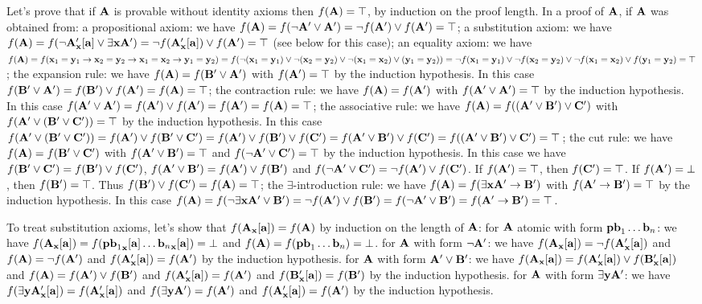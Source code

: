Let's prove that if ${\bf A}$ is provable without identity axioms then $f({\bf A}) = \top$, by induction on the proof length.
In a proof of ${\bf A}$, if ${\bf A}$ was obtained from:
\itemitem{$\bullet$} a propositional axiom: we have $f({\bf A}) = f(\neg {\bf A}' \lor {\bf A}') = \neg f({\bf A}') \lor f({\bf A}') = \top$;
\itemitem{$\bullet$} a substitution axiom: we have 
$f({\bf A}) = f(\neg {\bf A}'_{\bf x}[{\bf a}] \lor \exists {\bf x}{\bf A}') = \neg f({\bf A}'_{\bf x}[{\bf a}]) \lor f({\bf A}') = \top$ (see below for this case);
\itemitem{$\bullet$} an equality axiom: we have $f({\bf A}) = 
f({\bf x}_1 = {\bf y}_1 \to {\bf x}_2 = {\bf y}_2 \to {\bf x}_1 = {\bf x}_2 \to {\bf y}_1 = {\bf y}_2) =
f(\neg ({\bf x}_1 = {\bf y}_1) \lor \neg ({\bf x}_2 = {\bf y}_2) \lor \neg ({\bf x}_1 = {\bf x}_2) \lor ({\bf y}_1 = {\bf y}_2)) =
\neg f({\bf x}_1 = {\bf y}_1) \lor \neg f({\bf x}_2 = {\bf y}_2) \lor \neg f({\bf x}_1 = {\bf x}_2) \lor f({\bf y}_1 = {\bf y}_2) = \top$;
\itemitem{$\bullet$} the expansion rule: we have $f({\bf A}) = f({\bf B}' \lor {\bf A}')$ with $f({\bf A}') = \top$ by the induction hypothesis.
In this case $f({\bf B}' \lor {\bf A}') = f({\bf B}') \lor f({\bf A}') = f({\bf A}) = \top$;
\itemitem{$\bullet$} the contraction rule: we have $f({\bf A}) = f({\bf A}')$ with $f({\bf A}' \lor {\bf A}') = \top$ by the induction hypothesis. 
In this case $f({\bf A}' \lor {\bf A}') = f({\bf A}') \lor f({\bf A}') = f({\bf A}') = f({\bf A}) = \top$;
\itemitem{$\bullet$} the associative rule: we have $f({\bf A}) = f(({\bf A}' \lor {\bf B}') \lor {\bf C}')$ with $f({\bf A}' \lor ({\bf B}' \lor {\bf C}')) = \top$ by the induction hypothesis.
In this case $f({\bf A}' \lor ({\bf B}' \lor {\bf C}')) = f({\bf A}') \lor f({\bf B}' \lor {\bf C}') = f({\bf A}') \lor f({\bf B}') \lor f({\bf C}') =
f({\bf A}' \lor {\bf B}') \lor f({\bf C}') = f(({\bf A}' \lor {\bf B}') \lor {\bf C}') = \top$;
\itemitem{$\bullet$} the cut rule: we have $f({\bf A}) = f({\bf B}' \lor {\bf C}')$ with $f({\bf A}' \lor {\bf B}') = \top$ and $f(\neg {\bf A}' \lor {\bf C}') = \top$ by the induction hypothesis.
In this case we have $f({\bf B}' \lor {\bf C}') = f({\bf B}') \lor f({\bf C}')$, $f({\bf A}' \lor {\bf B}') = f({\bf A}') \lor f({\bf B}')$ and
$f(\neg {\bf A}' \lor {\bf C}') = \neg f({\bf A}') \lor f({\bf C}')$. If $f({\bf A}') = \top$, then $f({\bf C}') = \top$. 
If $f({\bf A}') = \bot$, then $f({\bf B}') = \top$. Thus $f({\bf B}') \lor f({\bf C}') = f({\bf A}) = \top$;
\itemitem{$\bullet$} the $\exists$-introduction rule: we have $f({\bf A}) = f(\exists {\bf x}{\bf A}' \to {\bf B}')$ with $f({\bf A}' \to {\bf B}') = \top$ by the induction hypothesis.
In this case $f({\bf A}) = f(\neg \exists {\bf x}{\bf A}' \lor {\bf B}') = \neg f({\bf A}') \lor f({\bf B}') = f(\neg {\bf A}' \lor {\bf B}') = f({\bf A}' \to {\bf B}') = \top$.

To treat substitution axioms, let's show that $f({\bf A}_{\bf x}[{\bf a}]) = f({\bf A})$ by induction on the length of ${\bf A}$:
\itemitem{$\bullet$} for ${\bf A}$ atomic with form ${\bf pb}_1 \dots {\bf b}_n$: we have $f({\bf A}_{\bf x}[{\bf a}]) = f({{\bf pb}_1}_{\bf x}[{\bf a}] \dots {{\bf b}_n}_{\bf x}[{\bf a}]) = \bot$
and $f({\bf A}) = f({\bf pb}_1 \dots {\bf b}_n) = \bot$.
\itemitem{$\bullet$} for ${\bf A}$ with form $\neg {\bf A}'$: we have $f({\bf A}_{\bf x}[{\bf a}]) = \neg f({\bf A}'_{\bf x}[{\bf a}])$
and $f({\bf A}) = \neg f({\bf A}')$ and $f({\bf A}'_{\bf x}[{\bf a}]) = f({\bf A}')$ by the induction hypothesis.
\itemitem{$\bullet$} for ${\bf A}$ with form ${\bf A}' \lor {\bf B}'$: we have $f({\bf A}_{\bf x}[{\bf a}]) = f({\bf A}'_{\bf x}[{\bf a}]) \lor f({\bf B}'_{\bf x}[{\bf a}])$
and $f({\bf A}) = f({\bf A}') \lor f({\bf B}')$ and $f({\bf A}'_{\bf x}[{\bf a}]) = f({\bf A}')$ and
$f({\bf B}'_{\bf x}[{\bf a}]) = f({\bf B}')$ by the induction hypothesis.
\itemitem{$\bullet$} for ${\bf A}$ with form $\exists {\bf y}{\bf A}'$: we have $f(\exists {\bf y}{\bf A}'_{\bf x}[{\bf a}]) = f({\bf A}'_{\bf x}[{\bf a}])$
and $f(\exists {\bf y}{\bf A}') = f({\bf A}')$ and $f({\bf A}'_{\bf x}[{\bf a}]) = f({\bf A}')$ by the induction hypothesis.

